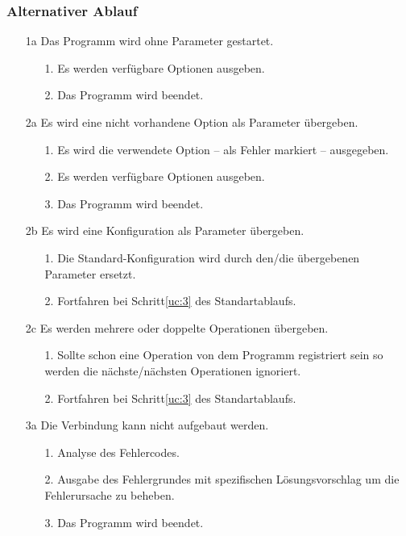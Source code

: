 \documentclass[Bachelorarbeit.tex]{subfiles}
\begin{document}
\subsubsection*{Alternativer Ablauf }
\begin{enumerate} %
\item[1a] Das Programm wird ohne Parameter gestartet.
\begin{enumerate}
\itemsep0em
\item[1.] Es werden verfügbare Optionen ausgeben.
\item[2.] Das Programm wird beendet.
\end{enumerate}
%
\item[2a] Es wird eine nicht vorhandene Option als Parameter übergeben.
\begin{enumerate}
\itemsep0em
\item[1.] Es wird die verwendete Option – als Fehler markiert – ausgegeben.
\item[2.] Es werden verfügbare Optionen ausgeben.
\item[3.] Das Programm wird beendet.
\end{enumerate}
%
\item[2b] Es wird eine Konfiguration als Parameter übergeben.
\begin{enumerate}
\itemsep0em
\item[1.] Die Standard-Konfiguration wird durch den/die übergebenen Parameter 
ersetzt.
\item[2.] Fortfahren bei Schritt\ref{uc:3} des Standartablaufs.
\end{enumerate}
%
\item[2c] Es werden mehrere oder doppelte Operationen übergeben.
\begin{enumerate}
\itemsep0em
\item[1.] Sollte schon eine Operation von dem Programm registriert sein so werden 
die nächste/nächsten Operationen ignoriert.
\item[2.] Fortfahren bei Schritt\ref{uc:3} des Standartablaufs.
\end{enumerate}
%
\item[3a] Die Verbindung kann nicht aufgebaut werden.
\begin{enumerate}
\itemsep0em
\item[1.] Analyse des Fehlercodes.
\item[2.] Ausgabe des Fehlergrundes mit spezifischen Lösungsvorschlag um die 
Fehlerursache zu beheben.
\item[3.] Das Programm wird beendet.

\end{enumerate}
\end{enumerate}
\end{document}
